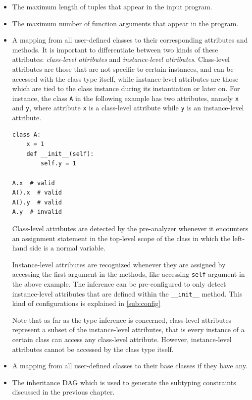\begin{itemize}
	\item The maximum length of tuples that appear in the input program.
	\item The maximum number of function arguments that appear in the program.
	\item A mapping from all user-defined classes to their corresponding attributes and methods. It is important to differentiate between two kinds of these attributes: \textit{class-level attributes} and \textit{instance-level attributes}. Class-level attributes are those that are not specific to certain instances, and can be accessed with the class type itself, while instance-level attributes are those which are tied to the class instance during its instantiation or later on. For instance, the class \lstinline|A| in the following example has two attributes, namely \lstinline|x| and \lstinline|y|, where attribute \lstinline|x| is a class-level attribute while \lstinline|y| is an instance-level attribute.
	
	\begin{lstlisting}
class A:
	x = 1
	def __init__(self):
		self.y = 1
		
A.x  # valid
A().x  # valid
A().y  # valid
A.y  # invalid
	\end{lstlisting}
	
	Class-level attributes are detected by the pre-analyzer whenever it encounters an assignment statement in the top-level scope of the class in which the left-hand side is a normal variable.
	
	Instance-level attributes are recognized whenever they are assigned by accessing the first argument in the methods, like accessing \lstinline|self| argument in the above example. The inference can be pre-configured to only detect instance-level attributes that are defined within the \lstinline|__init__| method. This kind of configurations is explained in \ref{sub:config}
	
	Note that as far as the type inference is concerned, class-level attributes represent a subset of the instance-level attributes, that is every instance of a certain class can access any class-level attribute. However, instance-level attributes cannot be accessed by the class type itself.
	
	\item A mapping from all user-defined classes to their base classes if they have any.
	\item The inheritance DAG which is used to generate the subtyping constraints discussed in the previous chapter.
\end{itemize}

